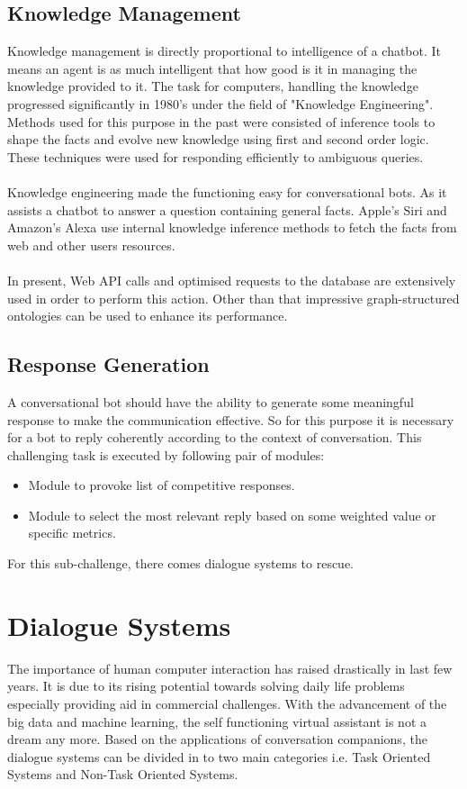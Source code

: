 \subsection{Knowledge Management}
Knowledge management is directly proportional to intelligence of a chatbot. It means an agent is as much intelligent that how good is it in managing the knowledge provided to it. The task for computers, handling the knowledge progressed significantly in 1980's under the field of "Knowledge Engineering". Methods used for this purpose in the past were consisted of inference tools to shape the facts and evolve new knowledge using first and second order logic. These techniques were used for responding efficiently to ambiguous queries. \cite{designandimplementation}
\\~\\
Knowledge engineering made the functioning easy for conversational bots. As it assists a chatbot to answer a question containing general facts. Apple's Siri and Amazon's Alexa use internal knowledge inference methods to fetch the facts from web and other users resources. \cite{designandimplementation}
\\~\\
In present, Web API calls and optimised requests to the database are extensively used in order to perform this action. Other than that impressive graph-structured ontologies can be used to enhance its performance. \cite{knowledgebase} \cite{designandimplementation}

\subsection{Response Generation}
A conversational bot should have the ability to generate some meaningful response to make the communication effective. So for this purpose it is necessary for a bot to reply coherently according to the context of conversation. This challenging task is executed by following pair of modules:
\begin{itemize}
\item Module to provoke list of competitive responses.
\item Module to select the most relevant reply based on some weighted value or specific metrics.
\end{itemize}
For this sub-challenge, there comes dialogue systems to rescue.

\section{Dialogue Systems}
The importance of human computer interaction has raised drastically in last few years. It is due to its rising potential towards solving daily life problems especially providing aid in commercial challenges. With the advancement of the big data and machine learning, the self functioning virtual assistant is not a dream any more. Based on the applications of conversation companions, the dialogue systems can be divided in to two main categories i.e. Task Oriented Systems and Non-Task Oriented Systems.

